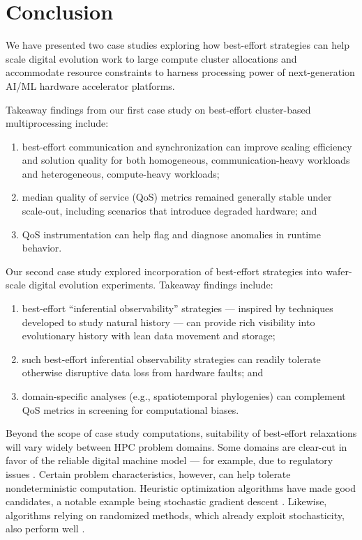 \vspace{-4.0ex}
\section{Conclusion} \label{moreno:sec:conclusion}
\vspace{-2.0ex}

We have presented two case studies exploring how best-effort strategies can help scale digital evolution work to large compute cluster allocations and accommodate resource constraints to harness processing power of next-generation AI/ML hardware accelerator platforms.

Takeaway findings from our first case study on best-effort cluster-based multiprocessing include:
\begin{enumerate}
\item best-effort communication and synchronization can improve scaling efficiency and solution quality for both homogeneous, communication-heavy workloads and heterogeneous, compute-heavy workloads;
\item median quality of service (QoS) metrics remained generally stable under scale-out, including scenarios that introduce degraded hardware; and
\item QoS instrumentation can help flag and diagnose anomalies in runtime behavior.
\end{enumerate}

Our second case study explored incorporation of best-effort strategies into wafer-scale digital evolution experiments.
Takeaway findings include:
\begin{enumerate}
\item best-effort ``inferential observability'' strategies --- inspired by techniques developed to study natural history --- can provide rich visibility into evolutionary history with lean data movement and storage;
\item such best-effort inferential observability strategies can readily tolerate otherwise disruptive data loss from hardware faults; and
\item domain-specific analyses (e.g., spatiotemporal phylogenies) can complement QoS metrics in screening for computational biases.
\end{enumerate}

Beyond the scope of case study computations, suitability of best-effort relaxations will vary widely between HPC problem domains.
Some domains are clear-cut in favor of the reliable digital machine model \cite{heroux2014toward} --- for example, due to regulatory issues \cite{dongarra2014applied}.
Certain problem characteristics, however, can help tolerate nondeterministic computation.
Heuristic optimization algorithms have made good candidates, a notable example being stochastic gradient descent \cite{dean2012large,zhao2019elastic,niu2011hogwild,noel2014dogwild,rhodes2020real}.
Likewise, algorithms relying on randomized methods, which already exploit stochasticity, also perform well \cite{chakrapani2008probabilistic,chakradhar2010best}.

